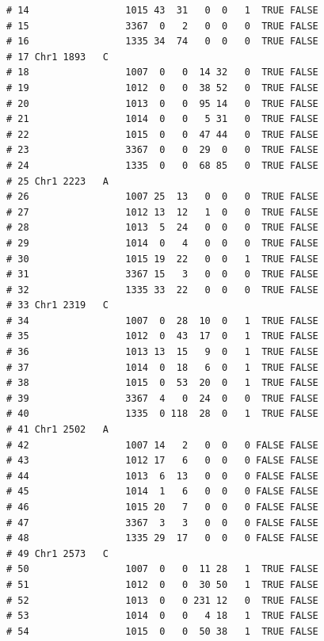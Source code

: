 \documentclass{article}\usepackage[]{graphicx}\usepackage[]{color}
\makeatletter
\newenvironment{kframe}{%
 \def\at@end@of@kframe{}%
 \ifinner\ifhmode%
  \def\at@end@of@kframe{\end{minipage}}%
  \begin{minipage}{\columnwidth}%
 \fi\fi%
 \def\FrameCommand##1{\hskip\@totalleftmargin \hskip-\fboxsep
 \colorbox{shadecolor}{##1}\hskip-\fboxsep
     \hskip-\linewidth \hskip-\@totalleftmargin \hskip\columnwidth}%
 \MakeFramed {\advance\hsize-\width
   \@totalleftmargin\z@ \linewidth\hsize
   \@setminipage}}%
 {\par\unskip\endMakeFramed%
 \at@end@of@kframe}
\newenvironment{knitrout}{}{} %
\makeatother
\begin{document}
\begin{knitrout}
\begin{kframe}
\begin{verbatim}
# 14                 1015 43  31   0  0   1  TRUE FALSE        
# 15                 3367  0   2   0  0   0  TRUE FALSE        
# 16                 1335 34  74   0  0   0  TRUE FALSE        
# 17 Chr1 1893   C                                             
# 18                 1007  0   0  14 32   0  TRUE FALSE        
# 19                 1012  0   0  38 52   0  TRUE FALSE        
# 20                 1013  0   0  95 14   0  TRUE FALSE        
# 21                 1014  0   0   5 31   0  TRUE FALSE        
# 22                 1015  0   0  47 44   0  TRUE FALSE        
# 23                 3367  0   0  29  0   0  TRUE FALSE        
# 24                 1335  0   0  68 85   0  TRUE FALSE        
# 25 Chr1 2223   A                                             
# 26                 1007 25  13   0  0   0  TRUE FALSE        
# 27                 1012 13  12   1  0   0  TRUE FALSE        
# 28                 1013  5  24   0  0   0  TRUE FALSE        
# 29                 1014  0   4   0  0   0  TRUE FALSE        
# 30                 1015 19  22   0  0   1  TRUE FALSE        
# 31                 3367 15   3   0  0   0  TRUE FALSE        
# 32                 1335 33  22   0  0   0  TRUE FALSE        
# 33 Chr1 2319   C                                             
# 34                 1007  0  28  10  0   1  TRUE FALSE        
# 35                 1012  0  43  17  0   1  TRUE FALSE        
# 36                 1013 13  15   9  0   1  TRUE FALSE        
# 37                 1014  0  18   6  0   1  TRUE FALSE        
# 38                 1015  0  53  20  0   1  TRUE FALSE        
# 39                 3367  4   0  24  0   0  TRUE FALSE        
# 40                 1335  0 118  28  0   1  TRUE FALSE        
# 41 Chr1 2502   A                                             
# 42                 1007 14   2   0  0   0 FALSE FALSE        
# 43                 1012 17   6   0  0   0 FALSE FALSE        
# 44                 1013  6  13   0  0   0 FALSE FALSE        
# 45                 1014  1   6   0  0   0 FALSE FALSE        
# 46                 1015 20   7   0  0   0 FALSE FALSE        
# 47                 3367  3   3   0  0   0 FALSE FALSE        
# 48                 1335 29  17   0  0   0 FALSE FALSE        
# 49 Chr1 2573   C                                             
# 50                 1007  0   0  11 28   1  TRUE FALSE        
# 51                 1012  0   0  30 50   1  TRUE FALSE        
# 52                 1013  0   0 231 12   0  TRUE FALSE        
# 53                 1014  0   0   4 18   1  TRUE FALSE        
# 54                 1015  0   0  50 38   1  TRUE FALSE        

\end{verbatim}
\end{kframe}
\end{knitrout}
\end{document}
